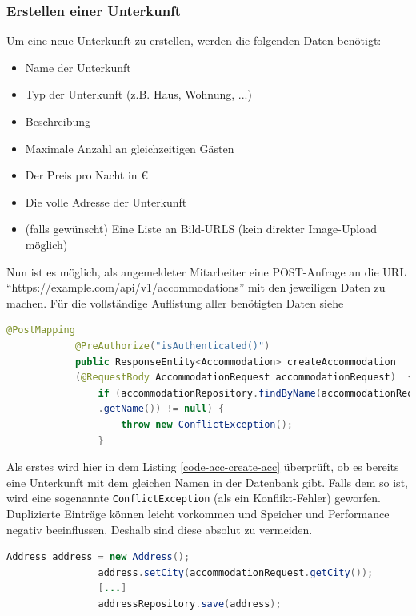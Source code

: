 		\subsubsection{Erstellen einer Unterkunft}
		
		Um eine neue Unterkunft zu erstellen, werden die folgenden Daten benötigt:
		
		\begin{itemize}
			\item Name der Unterkunft
			\item Typ der Unterkunft (z.B. Haus, Wohnung, ...)
			\item Beschreibung
			\item Maximale Anzahl an gleichzeitigen Gästen
			\item Der Preis pro Nacht in €
			\item Die volle Adresse der Unterkunft
			\item (falls gewünscht) Eine Liste an Bild-URLS (kein direkter Image-Upload möglich)
		\end{itemize}
		
		Nun ist es möglich, als angemeldeter Mitarbeiter eine POST-Anfrage an die URL \break \enquote{https://example.com/api/v1/accommodations} mit den jeweiligen Daten zu machen. Für die vollständige Auflistung aller benötigten Daten siehe \cite{website-github-backend-example-accommodation-post}
		
		\begin{lstlisting}[caption={Überprüfung, ob die zu erstellende Unterkunft bereits in der Datebank existiert.}, label={code-acc-create-acc}, language=Java]
			@PostMapping
			@PreAuthorize("isAuthenticated()")
			public ResponseEntity<Accommodation> createAccommodation
			(@RequestBody AccommodationRequest accommodationRequest)  {
				if (accommodationRepository.findByName(accommodationRequest
				.getName()) != null) {
					throw new ConflictException();
				}
			\end{lstlisting}
			
			Als erstes wird hier in dem Listing \ref{code-acc-create-acc} überprüft, ob es bereits eine Unterkunft mit dem gleichen Namen in der Datenbank gibt. Falls dem so ist, wird eine sogenannte \texttt{ConflictException} (als ein Konflikt-Fehler) geworfen. Duplizierte Einträge können leicht vorkommen und Speicher und Performance negativ beeinflussen. Deshalb sind diese absolut zu vermeiden.
			
			\begin{lstlisting}[caption={Erstellung des Adress-Objektes für die Unterkunft}, label={code-acc-extract-info-out-of-body}, language=Java]
				Address address = new Address();
				address.setCity(accommodationRequest.getCity());
				[...]
				addressRepository.save(address);
			\end{lstlisting}
			

